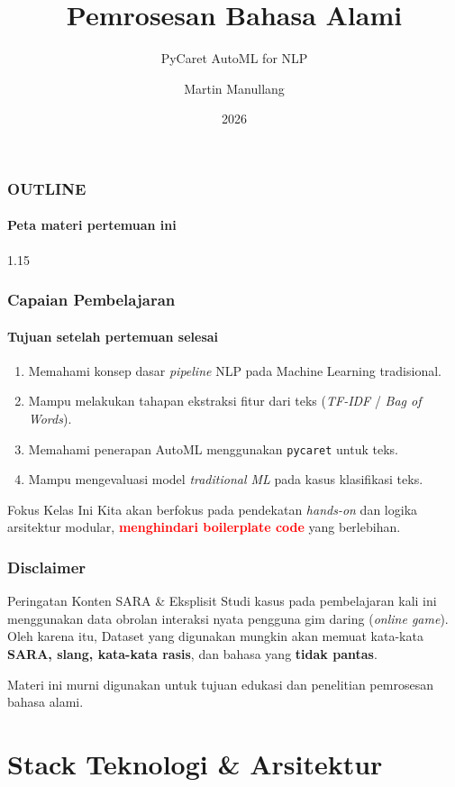 \documentclass[t,aspectratio=169,xcolor=dvipsnames]{beamer}
\title[Workshop Sesi 1]{Pemrosesan Bahasa Alami}
\subtitle{PyCaret AutoML for NLP}
\author[SD25-32202]{Martin Manullang}
\institute[ITERA]{Institut Teknologi Sumatera \\ mctm.web.id}
\date{\textcolor{nyublue}{2026}}
\newcommand{\tem}[1]{\textbf{\textcolor{red}{#1}}}
\begin{document}
\begin{frame}
    \titlepage
\end{frame}

\begin{frame}
    \frametitle{OUTLINE}
    \framesubtitle{Peta materi pertemuan ini}
    \small
    \begin{spacing}{1.15}
        \tableofcontents
    \end{spacing}
\end{frame}

\begin{frame}
    \frametitle{Capaian Pembelajaran}
    \framesubtitle{Tujuan setelah pertemuan selesai}
    \small
    \begin{enumerate}
        \item Memahami konsep dasar \textit{pipeline} NLP pada Machine Learning tradisional.
        \item Mampu melakukan tahapan ekstraksi fitur dari teks (\textit{TF-IDF} / \textit{Bag of Words}).
        \item Memahami penerapan AutoML menggunakan \texttt{pycaret} untuk teks.
        \item Mampu mengevaluasi model \textit{traditional ML} pada kasus klasifikasi teks.
    \end{enumerate}
    \begin{exampleblock}{Fokus Kelas Ini}
        Kita akan berfokus pada pendekatan \textit{hands-on} dan logika arsitektur modular, \tem{menghindari boilerplate code} yang berlebihan.
    \end{exampleblock}
\end{frame}

\begin{frame}
    \frametitle{Disclaimer}
    \begin{alertblock}{Peringatan Konten SARA \& Eksplisit}
        Studi kasus pada pembelajaran kali ini menggunakan data obrolan interaksi nyata pengguna gim daring (\textit{online game}).
        Oleh karena itu, Dataset yang digunakan mungkin akan memuat kata-kata \textbf{SARA, slang, kata-kata rasis}, dan bahasa yang \textbf{tidak pantas}.
        \vspace{0.2cm}
        
        Materi ini murni digunakan untuk tujuan edukasi dan penelitian pemrosesan bahasa alami.
    \end{alertblock}
\end{frame}

\section{Stack Teknologi \& Arsitektur}
\end{document}
